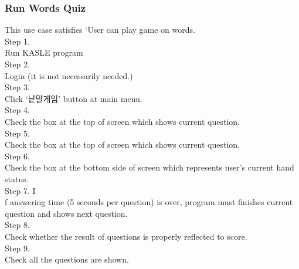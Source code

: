 \documentclass[10pt,journal,compsoc]{IEEEtran}
\begin{document}
\subsubsection{Run Words Quiz\\}
This use case satisfies ‘User can play game on words.
\\Step 1.
\\Run KASLE program
\\Step 2.
\\Login (it is not necessarily needed.)
\\Step 3.
\\Click ‘낱말게임’ button at main menu.
\\Step 4.
\\Check the box at the top of screen which shows current question.
\\Step 5.
\\Check the box at the top of screen which shows current question.
\\Step 6.
\\Check the box at the bottom side of screen which represents user’s current hand status.
\\Step 7. 
I\\f answering time (5 seconds per question) is over, program must finishes current question and shows next question.
\\Step 8.
\\Check whether the result of questions is properly reflected to score.
\\Step 9.
\\Check all the questions are shown.
\end{document}
